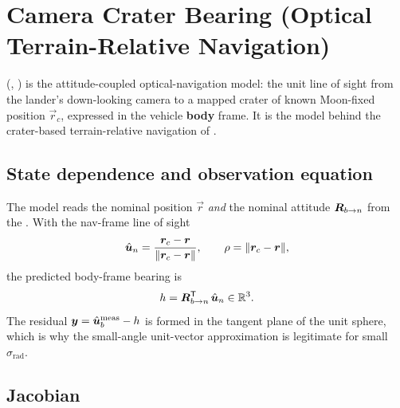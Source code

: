 \section{Camera Crater Bearing (Optical Terrain-Relative Navigation)}
\label{sec:meas-crater}

(,
) is the attitude-coupled
optical-navigation model: the unit line of sight from the lander's down-looking
camera to a mapped crater of known Moon-fixed position $\vec{r}_c$, expressed
in the vehicle \textbf{body} frame. It is the model behind the crater-based
terrain-relative navigation of \citet{dai2025fullstack}.

\subsection{State dependence and observation equation}

The model reads the nominal position $\vec{r}$ \emph{and} the nominal attitude
$\bm{R}_{b\to n}$ from the . With the nav-frame line of
sight
\begin{equation}
  \hat{\bm{u}}_n = \frac{\bm{r}_c - \bm{r}}{\lVert \bm{r}_c - \bm{r}\rVert},
  \qquad \rho = \lVert \bm{r}_c - \bm{r}\rVert,
  \label{eq:meas-crater-un}
\end{equation}
the predicted body-frame bearing is
\begin{equation}
  h = \bm{R}_{b\to n}^{\mathsf{T}}\,\hat{\bm{u}}_n \in \mathbb{R}^3 .
  \label{eq:meas-crater-h}
\end{equation}
The residual $\bm{y} = \hat{\bm{u}}_b^\mathrm{meas} - h$ is formed in the tangent
plane of the unit sphere, which is why the small-angle unit-vector
approximation is legitimate for small $\sigma_\mathrm{rad}$.

\subsection{Jacobian}

